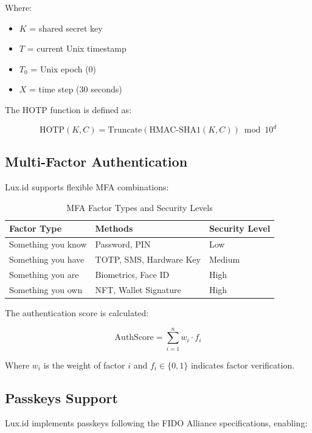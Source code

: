 Where:
\begin{itemize}
    \item $K$ = shared secret key
    \item $T$ = current Unix timestamp
    \item $T_0$ = Unix epoch (0)
    \item $X$ = time step (30 seconds)
\end{itemize}

The HOTP function is defined as:

\begin{equation}
    \text{HOTP}(K, C) = \text{Truncate}(\text{HMAC-SHA1}(K, C)) \bmod 10^d
\end{equation}

\subsection{Multi-Factor Authentication}

Lux.id supports flexible MFA combinations:

\begin{table}[h]
\centering
\begin{tabular}{|l|l|l|}
\hline
\textbf{Factor Type} & \textbf{Methods} & \textbf{Security Level} \\
\hline
Something you know & Password, PIN & Low \\
Something you have & TOTP, SMS, Hardware Key & Medium \\
Something you are & Biometrics, Face ID & High \\
Something you own & NFT, Wallet Signature & High \\
\hline
\end{tabular}
\caption{MFA Factor Types and Security Levels}
\end{table}

The authentication score is calculated:

\begin{equation}
    \text{AuthScore} = \sum_{i=1}^{n} w_i \cdot f_i
\end{equation}

Where $w_i$ is the weight of factor $i$ and $f_i \in \{0,1\}$ indicates factor verification.

\subsection{Passkeys Support}

Lux.id implements passkeys following the FIDO Alliance specifications, enabling:


